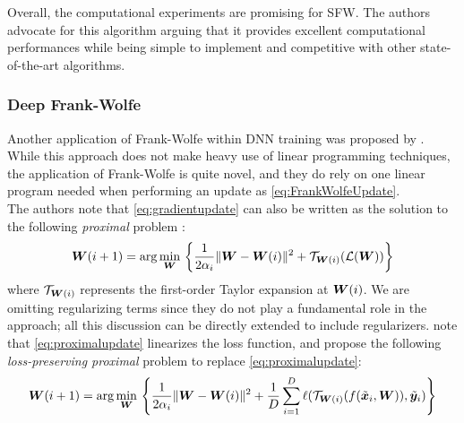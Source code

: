 Overall, the computational experiments are promising for SFW. The authors advocate for this algorithm arguing that it provides excellent computational performances while being simple to implement and competitive with other state-of-the-art algorithms.

\subsubsection{Deep Frank-Wolfe}

Another application of Frank-Wolfe within DNN training was proposed by \cite{berrada2018deep}. While this approach does not make heavy use of linear programming techniques, the application of Frank-Wolfe is quite novel, and they do rely on one linear program needed when performing an update as \eqref{eq:FrankWolfeUpdate}. \\

The authors note that \eqref{eq:gradientupdate} can also be written as the solution to the following \emph{proximal} problem \citep{bubeck2015convex}:
%
\begin{equation}\label{eq:proximalupdate}
    {\bm{W}}(i+1) = \arg\min_{{\bm{W}}}\,\left\{ \frac{1}{2\alpha_i}\|{\bm{W}} - {\bm{W}}(i)\|^2 + \mathcal{T}_{{\bm{W}}(i)}(\mathcal{L}({\bm{W}})) \right\}
\end{equation}
%
where $\mathcal{T}_{{\bm{W}}(i)}$ represents the first-order Taylor expansion at ${\bm{W}}(i)$. We are omitting regularizing terms since they do not play a fundamental role in the approach; all this discussion can be directly extended to include regularizers. \cite{berrada2018deep} note that \eqref{eq:proximalupdate} linearizes the loss function, and propose the following \emph{loss-preserving proximal} problem to replace \eqref{eq:proximalupdate}: 
%
\begin{equation}\label{eq:lossproximalupdate}
    {\bm{W}}(i+1) = \arg\min_{{\bm{W}}}\,\left\{ \frac{1}{2\alpha_i}\|{\bm{W}} - {\bm{W}}(i)\|^2 + \frac{1}{D} \sum_{i=1}^D \ell(\mathcal{T}_{{\bm{W}}(i)}(f(\tilde{{\bm{x}}}_i, {\bm{W}})), \tilde{{\bm{y}}}_i) \right\}
\end{equation}

